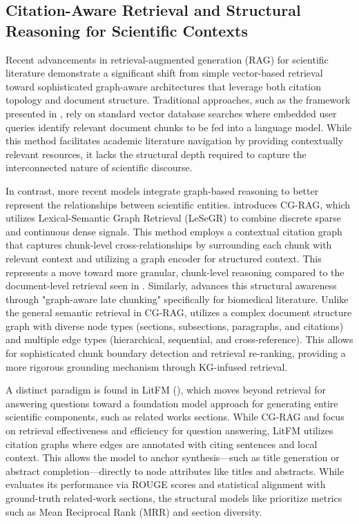 \documentclass[11pt]{article}
\begin{document}
\subsection{Citation-Aware Retrieval and Structural Reasoning for Scientific Contexts}

Recent advancements in retrieval-augmented generation (RAG) for scientific literature demonstrate a significant shift from simple vector-based retrieval toward sophisticated graph-aware architectures that leverage both citation topology and document structure. Traditional approaches, such as the framework presented in \citep{2412.15404}, rely on standard vector database searches where embedded user queries identify relevant document chunks to be fed into a language model. While this method facilitates academic literature navigation by providing contextually relevant resources, it lacks the structural depth required to capture the interconnected nature of scientific discourse.

In contrast, more recent models integrate graph-based reasoning to better represent the relationships between scientific entities. \citep{2501.15067} introduces CG-RAG, which utilizes Lexical-Semantic Graph Retrieval (LeSeGR) to combine discrete sparse and continuous dense signals. This method employs a contextual citation graph that captures chunk-level cross-relationships by surrounding each chunk with relevant context and utilizing a graph encoder for structured context. This represents a move toward more granular, chunk-level reasoning compared to the document-level retrieval seen in \citep{2412.15404}. Similarly, \citep{2603.22633} advances this structural awareness through "graph-aware late chunking" specifically for biomedical literature. Unlike the general semantic retrieval in CG-RAG, \citep{2603.22633} utilizes a complex document structure graph with diverse node types (sections, subsections, paragraphs, and citations) and multiple edge types (hierarchical, sequential, and cross-reference). This allows for sophisticated chunk boundary detection and retrieval re-ranking, providing a more rigorous grounding mechanism through KG-infused retrieval.

A distinct paradigm is found in LitFM (\citep{2409.12177}), which moves beyond retrieval for answering questions toward a foundation model approach for generating entire scientific components, such as related works sections. While CG-RAG and \citep{2603.22633} focus on retrieval effectiveness and efficiency for question answering, LitFM utilizes citation graphs where edges are annotated with citing sentences and local context. This allows the model to anchor synthesis—such as title generation or abstract completion—directly to node attributes like titles and abstracts. While \citep{2409.12177} evaluates its performance via ROUGE scores and statistical alignment with ground-truth related-work sections, the structural models like \citep{2603.22633} prioritize metrics such as Mean Reciprocal Rank (MRR) and section diversity.
\end{document}
